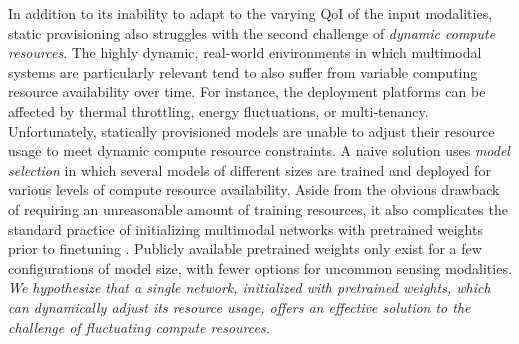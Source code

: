 In addition to its inability to adapt to the varying QoI of the input modalities, static provisioning also struggles with the second challenge of \emph{dynamic compute resources}. The highly dynamic, real-world environments in which multimodal systems are particularly relevant tend to also suffer from variable computing resource availability over time. For instance, the deployment platforms can be affected by thermal throttling, energy fluctuations, or multi-tenancy. Unfortunately, statically provisioned models are unable to adjust their resource usage to meet dynamic compute resource constraints. A naive solution uses \emph{model selection} in which several models of different sizes are trained and deployed for various levels of compute resource availability. Aside from the obvious drawback of requiring an unreasonable amount of training resources, it also complicates the standard practice of initializing multimodal networks with pretrained weights prior to finetuning \cite{manzoor2023survey}. Publicly available pretrained weights only exist for a few configurations of model size, with fewer options for uncommon sensing modalities. \emph{We hypothesize that a single network, initialized with pretrained weights, which can dynamically adjust its resource usage, offers an effective solution to the challenge of fluctuating compute resources.}










